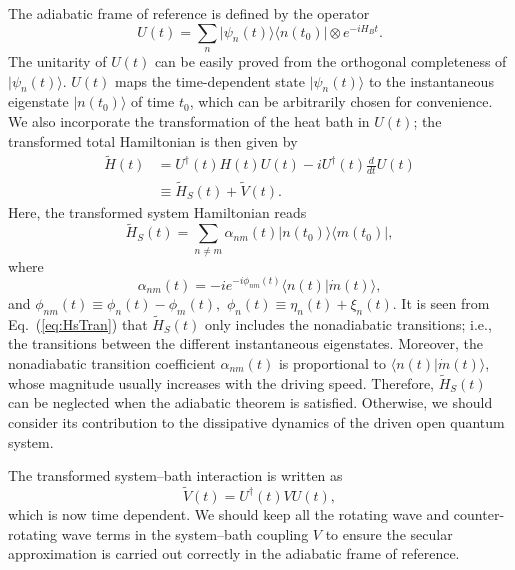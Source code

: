 \documentclass[english,nofootinbib, pra, twocolumn,superscriptaddress]{revtex4-1}
\begin{document}
The adiabatic frame of reference is defined by the operator
\begin{equation}
U(t)=\sum_{n}\vert\psi_{n}(t)\rangle\langle n(t_{0})\vert\otimes e^{-iH_{B}t}.\label{eq:Theta}
\end{equation}
The unitarity of $U(t)$ can be easily proved from the orthogonal completeness of $\vert\psi_{n}(t)\rangle$.
$U(t)$ maps the time-dependent state $\vert\psi_{n}(t)\rangle$
to the instantaneous eigenstate $\vert n(t_{0})\rangle$ of
time $t_{0}$, which can be arbitrarily chosen for convenience.
We also incorporate the transformation of the heat bath in $U(t)$;
the transformed total Hamiltonian is then given by
\begin{align}
\tilde{H}(t) & =U^{\dagger}(t)H(t)U(t)-iU^{\dagger}(t)\frac{d}{dt}U(t)\nonumber \\
 & \equiv\tilde{H}_{S}(t)+\tilde{V}(t).\label{eq:Htran}
\end{align}
Here, the transformed system Hamiltonian reads 
\begin{equation}
\tilde{H}_{S}(t)=\sum_{n\neq m}\alpha_{nm}(t)\vert n(t_{0})\rangle\langle m(t_{0})\vert,\label{eq:HsTran}
\end{equation}
where
\begin{equation}
\alpha_{nm}(t)=-ie^{-i\phi_{nm}(t)}\langle n(t)\vert\dot{m}(t)\rangle,\label{eq:a_nm}
\end{equation}
and $\phi_{nm}(t)\equiv\phi_{n}(t)-\phi_{m}(t),$ $\phi_{n}(t)\equiv\eta_{n}(t)+\xi_{n}(t)$.
It is seen from Eq.~(\ref{eq:HsTran}) that $\tilde{H}_{S}(t)$
only includes the nonadiabatic transitions; i.e., the transitions
between the different instantaneous eigenstates. Moreover,
the nonadiabatic transition coefficient $\alpha_{nm}(t)$ is proportional
to $\langle n(t)\vert\dot{m}(t)\rangle$, whose magnitude usually increases
with the driving speed. Therefore, $\tilde{H}_{S}(t)$ can be neglected
when the adiabatic theorem is satisfied. Otherwise, we should consider
its contribution to the dissipative dynamics of the driven open quantum
system. 

The transformed system--bath interaction is written as
\begin{equation}
\tilde{V}(t)=U^{\dagger}(t)VU(t),\label{eq:Vt}
\end{equation}
which is now time dependent. We should keep all the rotating wave and counter-rotating wave terms in the
system--bath coupling $V$ to ensure the secular approximation
is carried out correctly in the adiabatic frame of reference.
\end{document}
